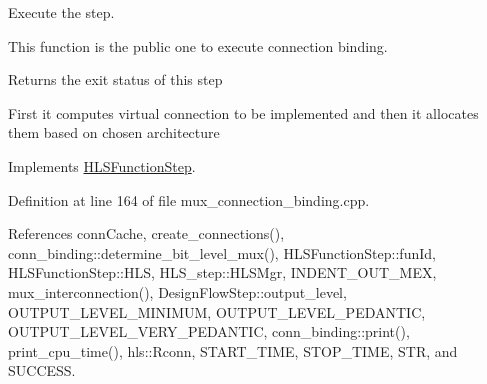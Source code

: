 Execute the step. 

This function is the public one to execute connection binding.

\begin{DoxyReturn}{Returns}
the exit status of this step
\end{DoxyReturn}
First it computes virtual connection to be implemented and then it allocates them based on chosen architecture 

Implements \hyperlink{classHLSFunctionStep_a8db4c00d080655984d98143206fc9fa8}{H\+L\+S\+Function\+Step}.



Definition at line 164 of file mux\+\_\+connection\+\_\+binding.\+cpp.



References conn\+Cache, create\+\_\+connections(), conn\+\_\+binding\+::determine\+\_\+bit\+\_\+level\+\_\+mux(), H\+L\+S\+Function\+Step\+::fun\+Id, H\+L\+S\+Function\+Step\+::\+H\+LS, H\+L\+S\+\_\+step\+::\+H\+L\+S\+Mgr, I\+N\+D\+E\+N\+T\+\_\+\+O\+U\+T\+\_\+\+M\+EX, mux\+\_\+interconnection(), Design\+Flow\+Step\+::output\+\_\+level, O\+U\+T\+P\+U\+T\+\_\+\+L\+E\+V\+E\+L\+\_\+\+M\+I\+N\+I\+M\+UM, O\+U\+T\+P\+U\+T\+\_\+\+L\+E\+V\+E\+L\+\_\+\+P\+E\+D\+A\+N\+T\+IC, O\+U\+T\+P\+U\+T\+\_\+\+L\+E\+V\+E\+L\+\_\+\+V\+E\+R\+Y\+\_\+\+P\+E\+D\+A\+N\+T\+IC, conn\+\_\+binding\+::print(), print\+\_\+cpu\+\_\+time(), hls\+::\+Rconn, S\+T\+A\+R\+T\+\_\+\+T\+I\+ME, S\+T\+O\+P\+\_\+\+T\+I\+ME, S\+TR, and S\+U\+C\+C\+E\+SS.

